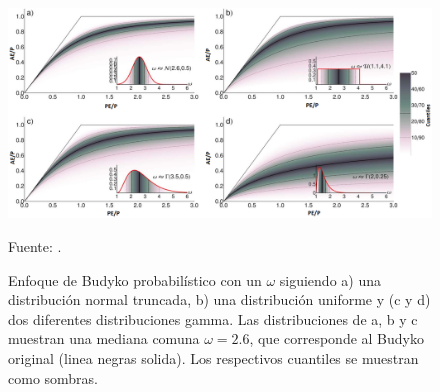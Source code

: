 \vspace{.25cm}
\begin{figure}[ht!]
\centering
	\includegraphics[scale=0.42]{Images/Greve02.png}
	\caption{Enfoque de Budyko probabilístico con un $\omega$ siguiendo a) una distribución normal truncada, b) una distribución uniforme y (c y d) dos diferentes distribuciones gamma. Las distribuciones de a, b y c muestran una mediana comuna $\omega = 2.6$, que corresponde al Budyko original (linea negras solida). Los respectivos cuantiles se muestran como sombras.}
	Fuente: \citet{Greve2015}.
	\label{fig:Greve02}
\end{figure}